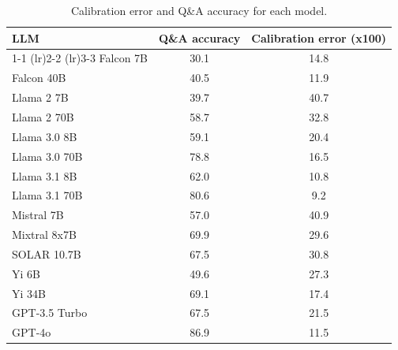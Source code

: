 \begin{table}[h]
\caption{Calibration error and Q\&A accuracy for each model.}
\label{tab:calibration_prob_max}
\centering
\begin{tabular}{lcc}
\toprule
LLM & Q\&A accuracy & Calibration error (x100) \\ 
\cmidrule(lr){1-1} \cmidrule(lr){2-2} \cmidrule(lr){3-3}
Falcon 7B & 30.1 & 14.8\\
Falcon 40B & 40.5 & 11.9\\
Llama 2 7B & 39.7 & 40.7\\
Llama 2 70B & 58.7 & 32.8\\
Llama 3.0 8B & 59.1 & 20.4\\
Llama 3.0 70B & 78.8 & 16.5\\
Llama 3.1 8B & 62.0 & 10.8\\
Llama 3.1 70B & 80.6 & 9.2\\
Mistral 7B & 57.0 & 40.9\\
Mixtral 8x7B & 69.9 & 29.6\\
SOLAR 10.7B & 67.5 & 30.8\\
Yi 6B & 49.6 & 27.3\\
Yi 34B & 69.1 & 17.4\\
GPT-3.5 Turbo & 67.5 & 21.5\\
GPT-4o & 86.9 & 11.5\\
\bottomrule
\end{tabular}
\end{table}
